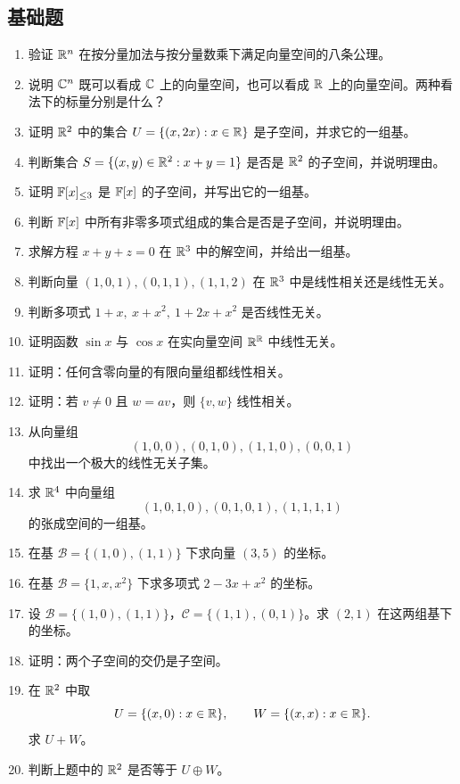 \subsection*{基础题}
\begin{enumerate}[label=\arabic*., leftmargin=2.5em]
  \item \basic 验证 $\mathbb{R}^n$ 在按分量加法与按分量数乘下满足向量空间的八条公理。
  \item \basic 说明 $\mathbb{C}^n$ 既可以看成 $\mathbb{C}$ 上的向量空间，也可以看成 $\mathbb{R}$ 上的向量空间。两种看法下的标量分别是什么？
  \item \basic 证明 $\mathbb{R}^2$ 中的集合 $U=\{(x,2x):x\in\mathbb{R}\}$ 是子空间，并求它的一组基。
  \item \basic 判断集合 $S=\{(x,y)\in\mathbb{R}^2:x+y=1\}$ 是否是 $\mathbb{R}^2$ 的子空间，并说明理由。
  \item \basic 证明 $\mathbb{F}[x]_{\le 3}$ 是 $\mathbb{F}[x]$ 的子空间，并写出它的一组基。
  \item \basic 判断 $\mathbb{F}[x]$ 中所有非零多项式组成的集合是否是子空间，并说明理由。
  \item \basic 求解方程 $x+y+z=0$ 在 $\mathbb{R}^3$ 中的解空间，并给出一组基。
  \item \basic 判断向量 $(1,0,1),(0,1,1),(1,1,2)$ 在 $\mathbb{R}^3$ 中是线性相关还是线性无关。
  \item \basic 判断多项式 $1+x,\ x+x^2,\ 1+2x+x^2$ 是否线性无关。
  \item \basic 证明函数 $\sin x$ 与 $\cos x$ 在实向量空间 $\mathbb{R}^{\mathbb{R}}$ 中线性无关。
  \item \basic 证明：任何含零向量的有限向量组都线性相关。
  \item \basic 证明：若 $v\ne 0$ 且 $w=av$，则 $\{v,w\}$ 线性相关。
  \item \basic 从向量组
  \[
  (1,0,0),(0,1,0),(1,1,0),(0,0,1)
  \]
  中找出一个极大的线性无关子集。
  \item \basic 求 $\mathbb{R}^4$ 中向量组
  \[
  (1,0,1,0),(0,1,0,1),(1,1,1,1)
  \]
  的张成空间的一组基。
  \item \basic 在基 $\mathcal B=\{(1,0),(1,1)\}$ 下求向量 $(3,5)$ 的坐标。
  \item \basic 在基 $\mathcal B=\{1,x,x^2\}$ 下求多项式 $2-3x+x^2$ 的坐标。
  \item \basic 设 $\mathcal B=\{(1,0),(1,1)\}$，$\mathcal C=\{(1,1),(0,1)\}$。求 $(2,1)$ 在这两组基下的坐标。
  \item \basic 证明：两个子空间的交仍是子空间。
  \item \basic 在 $\mathbb{R}^2$ 中取
  \[
  U=\{(x,0):x\in\mathbb{R}\},\qquad W=\{(x,x):x\in\mathbb{R}\}.
  \]
  求 $U+W$。
  \item \basic 判断上题中的 $\mathbb{R}^2$ 是否等于 $U\oplus W$。

\end{enumerate}
